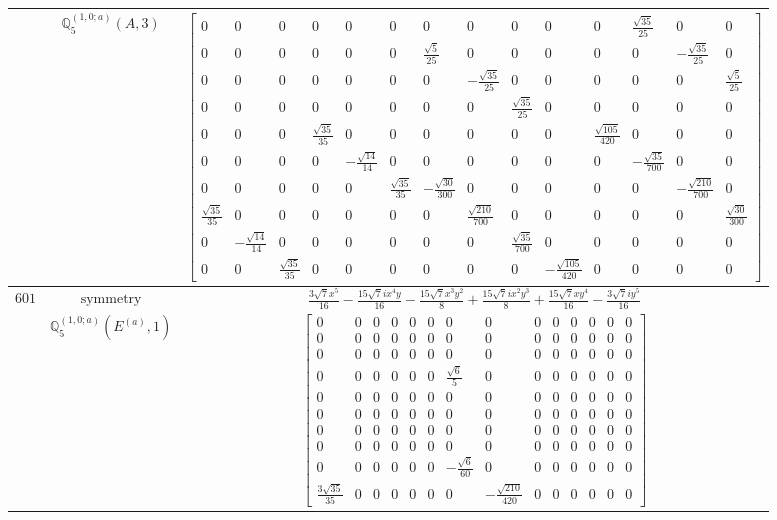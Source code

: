 \documentclass[fleqn,8pt,landscape]{jsarticle}
\begin{document}
\begin{longtable}{ccc}
$  $ & $ \mathbb{Q}_{5}^{(1,0;a)}(A,3) $ & $ \begin{bmatrix} 0 & 0 & 0 & 0 & 0 & 0 & 0 & 0 & 0 & 0 & 0 & \frac{\sqrt{35}}{25} & 0 & 0 \\ 0 & 0 & 0 & 0 & 0 & 0 & \frac{\sqrt{5}}{25} & 0 & 0 & 0 & 0 & 0 & - \frac{\sqrt{35}}{25} & 0 \\ 0 & 0 & 0 & 0 & 0 & 0 & 0 & - \frac{\sqrt{35}}{25} & 0 & 0 & 0 & 0 & 0 & \frac{\sqrt{5}}{25} \\ 0 & 0 & 0 & 0 & 0 & 0 & 0 & 0 & \frac{\sqrt{35}}{25} & 0 & 0 & 0 & 0 & 0 \\ 0 & 0 & 0 & \frac{\sqrt{35}}{35} & 0 & 0 & 0 & 0 & 0 & 0 & \frac{\sqrt{105}}{420} & 0 & 0 & 0 \\ 0 & 0 & 0 & 0 & - \frac{\sqrt{14}}{14} & 0 & 0 & 0 & 0 & 0 & 0 & - \frac{\sqrt{35}}{700} & 0 & 0 \\ 0 & 0 & 0 & 0 & 0 & \frac{\sqrt{35}}{35} & - \frac{\sqrt{30}}{300} & 0 & 0 & 0 & 0 & 0 & - \frac{\sqrt{210}}{700} & 0 \\ \frac{\sqrt{35}}{35} & 0 & 0 & 0 & 0 & 0 & 0 & \frac{\sqrt{210}}{700} & 0 & 0 & 0 & 0 & 0 & \frac{\sqrt{30}}{300} \\ 0 & - \frac{\sqrt{14}}{14} & 0 & 0 & 0 & 0 & 0 & 0 & \frac{\sqrt{35}}{700} & 0 & 0 & 0 & 0 & 0 \\ 0 & 0 & \frac{\sqrt{35}}{35} & 0 & 0 & 0 & 0 & 0 & 0 & - \frac{\sqrt{105}}{420} & 0 & 0 & 0 & 0 \end{bmatrix} $ \\ \hline
$ 601 $ & $ \text{symmetry} $ & $ \frac{3 \sqrt{7} x^{5}}{16} - \frac{15 \sqrt{7} i x^{4} y}{16} - \frac{15 \sqrt{7} x^{3} y^{2}}{8} + \frac{15 \sqrt{7} i x^{2} y^{3}}{8} + \frac{15 \sqrt{7} x y^{4}}{16} - \frac{3 \sqrt{7} i y^{5}}{16} $ \\
$  $ & $ \mathbb{Q}_{5}^{(1,0;a)}(E^{(a)},1) $ & $ \begin{bmatrix} 0 & 0 & 0 & 0 & 0 & 0 & 0 & 0 & 0 & 0 & 0 & 0 & 0 & 0 \\ 0 & 0 & 0 & 0 & 0 & 0 & 0 & 0 & 0 & 0 & 0 & 0 & 0 & 0 \\ 0 & 0 & 0 & 0 & 0 & 0 & 0 & 0 & 0 & 0 & 0 & 0 & 0 & 0 \\ 0 & 0 & 0 & 0 & 0 & 0 & \frac{\sqrt{6}}{5} & 0 & 0 & 0 & 0 & 0 & 0 & 0 \\ 0 & 0 & 0 & 0 & 0 & 0 & 0 & 0 & 0 & 0 & 0 & 0 & 0 & 0 \\ 0 & 0 & 0 & 0 & 0 & 0 & 0 & 0 & 0 & 0 & 0 & 0 & 0 & 0 \\ 0 & 0 & 0 & 0 & 0 & 0 & 0 & 0 & 0 & 0 & 0 & 0 & 0 & 0 \\ 0 & 0 & 0 & 0 & 0 & 0 & 0 & 0 & 0 & 0 & 0 & 0 & 0 & 0 \\ 0 & 0 & 0 & 0 & 0 & 0 & - \frac{\sqrt{6}}{60} & 0 & 0 & 0 & 0 & 0 & 0 & 0 \\ \frac{3 \sqrt{35}}{35} & 0 & 0 & 0 & 0 & 0 & 0 & - \frac{\sqrt{210}}{420} & 0 & 0 & 0 & 0 & 0 & 0 \end{bmatrix} $ \\ \hline

\end{longtable}
\end{document}
